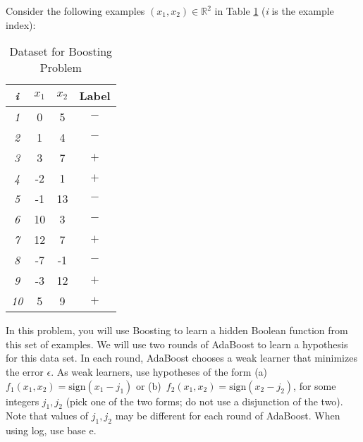 \documentclass[11pt]{article}
\begin{document}
\newpage
{}
  Consider the following examples $(x_1,x_2) \in \mathbb{R}^2$ in Table \ref{table:data_boost} ({\em i} is the example index):
  \begin{table}[ht]
    \begin{center}
        \begin{tabular}{|c|c|c|c|}
          \hline
          {\em i}  & $x_1$  & $x_2$ & Label \\
          \hline
          {\em 1}  & 0  & 5 & $-$ \\ 
          \hline
          {\em 2}  & 1  & 4 & $-$ \\
          \hline
          {\em 3}  & 3  & 7 & $+$ \\
          \hline
          {\em 4}  & -2  & 1 & $+$ \\ 
          \hline
          {\em 5}  & -1  & 13 & $-$ \\
          \hline
          {\em 6}  & 10  & 3 & $-$ \\
          \hline
          {\em 7}  & 12 & 7 & $+$ \\
          \hline
          {\em 8}  & -7  & -1 & $-$ \\
          \hline
          {\em 9}  & -3  & 12 & $+$ \\
          \hline
          {\em 10} & 5  & 9 & $+$ \\
          \hline
        \end{tabular}
    \end{center}
    \caption{Dataset for Boosting Problem}\label{table:data_boost}
  \end{table}

  In this problem, you will use Boosting to learn a hidden Boolean function from this set of examples.
We will use two rounds of AdaBoost to learn a hypothesis for this
    data set. In each round, AdaBoost chooses a weak learner that minimizes the error $\epsilon$. As weak learners, use hypotheses of the form (a)~$f_1(x_1, x_2) = \text{sign}(x_1- j_1)$ or (b)~$f_2(x_1, x_2) = \text{sign}(x_2 - j_2)$, for some integers $j_1,j_2$ (pick one of the two forms; do not use a disjunction of the two). Note that values of $j_1, j_2$ may be different for each round of AdaBoost. When using log, use base e.
\end{document}
